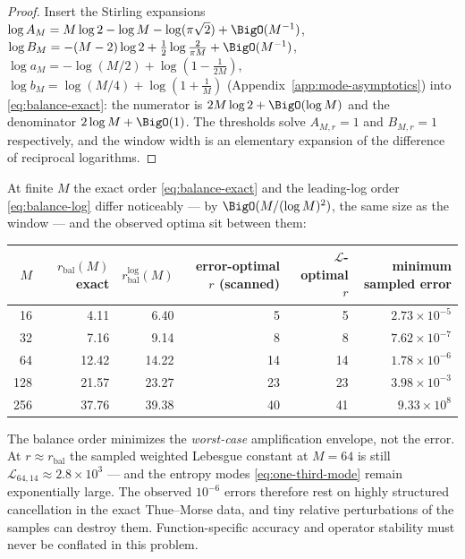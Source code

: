 \documentclass[11pt,oneside]{article}
\numberwithin{equation}{section}
\theoremstyle{definition}
\theoremstyle{remark}
\newcommand{\Leb}{\mathscr L}
\begin{document}
\begin{proof}
Insert the Stirling expansions
$\log A_M=M\log2-\log M-\log(\pi\sqrt2)+\BigO(M^{-1})$,
$\log B_M=-(M-2)\log2+\tfrac12\log\tfrac2{\pi M}+\BigO(M^{-1})$,
$\log a_M=-\log(M/2)+\log(1-\tfrac1{2M})$,
$\log b_M=\log(M/4)+\log(1+\tfrac1M)$
(Appendix~\ref{app:mode-asymptotics}) into \eqref{eq:balance-exact}: the
numerator is $2M\log2+\BigO(\log M)$ and the denominator
$2\log M+\BigO(1)$.  The thresholds solve
$A_{M,r}=1$ and $B_{M,r}=1$ respectively, and the window width is an
elementary expansion of the difference of reciprocal logarithms.
\end{proof}

At finite $M$ the exact order \eqref{eq:balance-exact} and the
leading-log order \eqref{eq:balance-log} differ noticeably --- by
$\BigO(M/(\log M)^2)$, the same size as the window --- and the
observed optima sit between them:

\begin{center}
\small
\begin{tabular}{rrrrrr}
\toprule
$M$ & $r_{\mathrm{bal}}(M)$ exact
 & $r^{\log}_{\mathrm{bal}}(M)$
 & error-optimal $r$ (scanned)
 & $\Leb$-optimal $r$
 & minimum sampled error \\
\midrule
16  & 4.11  & 6.40  & 5  & 5  & $2.73\times10^{-5}$ \\
32  & 7.16  & 9.14  & 8  & 8  & $7.62\times10^{-7}$ \\
64  & 12.42 & 14.22 & 14 & 14 & $1.78\times10^{-6}$ \\
128 & 21.57 & 23.27 & 23 & 23 & $3.98\times10^{-3}$ \\
256 & 37.76 & 39.38 & 40 & 41 & $9.33\times10^{8}$ \\
\bottomrule
\end{tabular}
\label{tab:balance}
\end{center}

\begin{warning}
The balance order minimizes the \emph{worst-case} amplification
envelope, not the error.  At $r\approx r_{\mathrm{bal}}$ the sampled
weighted Lebesgue constant at $M=64$ is still
$\Leb_{64,14}\approx2.8\times10^{3}$ --- and the entropy modes
\eqref{eq:one-third-mode} remain exponentially large.  The observed
$10^{-6}$ errors therefore rest on highly structured cancellation in
the exact Thue--Morse data, and tiny relative perturbations of the
samples can destroy them.  Function-specific accuracy and operator
stability must never be conflated in this problem.
\end{warning}
\end{document}
